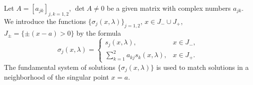 \documentclass[a0paper,25pt]{tikzposter} %
\begin{document}
\begin{columns}
{Let $A=[a_{jk}]_{j,k=1,2}$, $\det A\ne 0$ be a given matrix with complex numbers $a_{jk}$. We introduce the functions  $\{\sigma_j(x,\lambda)\}_{j=1,2}$, $x\in J_{-}\cup J_{+}$, $J_{\pm}=\{\pm (x-a)>0\}$ by the formula
\begin{equation*}
\sigma_j(x,\lambda)=\left\{
\begin{array}{ll}
s_j(x,\lambda), & x\in J_{-},\\
\sum\limits_{k=1}^{2}a_{kj}s_k(x,\lambda),&  x\in J_{+}.
\end{array}\right.
\label{sigmajinsk}
\end{equation*}
The fundamental system of solutions $\{\sigma_j(x,\lambda)\}$ is used to match solutions in a neighborhood of the singular point  $x=a$. 

}
\end{columns}
\end{document}
